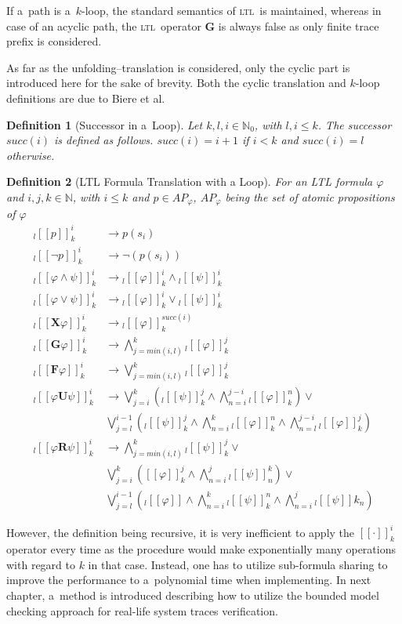 \documentclass[12pt,twoside,draft]{fithesis}
\newcommand{\ltl}{\textsc{ltl}~}
\newcommand{\mNatural}{\mathbb{N}}
\newcommand{\bF}{\mathbf{F}}
\newcommand{\bG}{\mathbf{G}}
\newcommand{\bX}{\mathbf{X}}
\newcommand{\bU}{\mathbf{U}}
\newcommand{\bR}{\mathbf{R}}
\newtheorem{mydef}{Definition}
\begin{document}
If a~path is a~$k$-loop, the standard semantics of \ltl is maintained,
whereas in case of an acyclic path, the \ltl operator $\bG$ is always
false as only finite trace prefix is considered.

As far as the unfolding--translation is considered, only the cyclic part
is introduced here for the sake of brevity.
Both the cyclic translation and $k$-loop definitions are due to Biere
et al.
\begin{mydef}[Successor in a~Loop]
Let $k,l,i\in\mNatural_0$, with $l,i \leq k$. The successor $succ(i)$ is
defined as follows. $succ(i)=i+1$ if $i<k$ and $succ(i)=l$ otherwise.
\end{mydef}
\begin{mydef}[LTL Formula Translation with a Loop]
For an LTL formula $\varphi$ and $i,j,k\in\mNatural$, with $i\leq k$ and
$p\in {AP}_\varphi$, ${AP}_\varphi$ being the set of atomic propositions
of $\varphi$
\begin{align}
	{}_l[[p]]_k^i&\rightarrow p(s_i)\\
	{}_l[[\neg p]]_k^i&\rightarrow\neg(p(s_i))\\
	{}_l[[\varphi\wedge\psi]]_k^i&\rightarrow
		{}_l[[\varphi]]_k^i\wedge{}_l[[\psi]]_k^i\\
	{}_l[[\varphi\vee\psi]]_k^i&\rightarrow
		{}_l[[\varphi]]_k^i\vee{}_l[[\psi]]_k^i\\
	{}_l[[\bX\varphi]]_k^i&\rightarrow{}_l[[\varphi]]_k^{succ(i)}\\
	{}_l[[\bG\varphi]]_k^i&\rightarrow\bigwedge_{j=min(i,l)}^k
		{}_l[[\varphi]]_k^j\\
	{}_l[[\bF\varphi]]_k^i&\rightarrow\bigvee_{j=min(i,l)}^k
		{}_l[[\varphi]]_k^j\\
	{}_l[[\varphi\bU\psi]]_k^i&\rightarrow\bigvee_{j=i}^k\left(
		{}_l[[\psi]]_k^j\wedge\bigwedge_{n=i}^{j-i}{}_l[[\varphi]]_k^n
		\right)\vee\nonumber\\
		&\bigvee_{j=l}^{i-1}\left({}_l[[\psi]]_k^j\wedge\bigwedge_{n=i}^k
		{}_l[[\varphi]]_k^n\wedge\bigwedge_{n=l}^{j-i}
		{}_l[[\varphi]]_k^j\right)\\
	{}_l[[\varphi\bR\psi]]_k^i&\rightarrow\bigwedge_{j=min(i,l)}^k
		{}_l[[\psi]]_k^j\vee\nonumber\\
		&\bigvee_{j=i}^k\left([[\varphi]]_k^j\wedge\bigwedge_{n=i}^j
		{}_l[[\psi]]_n^k\right)\vee\nonumber\\
		&\bigvee_{j=l}^{i-1}\left({}_l[[\varphi]]\wedge\bigwedge_{n=i}^k
		{}_l[[\psi]]_k^n\wedge\bigwedge_{n=i}^j{}_l[[\psi]]k_n\right)
\end{align} 
\end{mydef}
However, the definition being recursive, it is very inefficient to
apply the $[[\cdot]]_k^i$ operator every time as the procedure would
make exponentially many operations with regard to $k$ in that case.
Instead, one has to utilize sub-formula sharing to improve the
performance to a~polynomial time when implementing\cite{biere}. In next
chapter, a~method is introduced describing how to utilize the bounded
model checking approach for real-life system traces verification.
\end{document}
